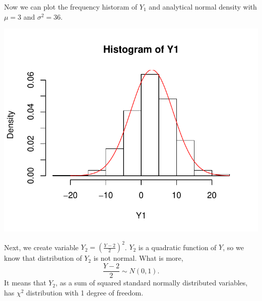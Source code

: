 \documentclass[12pt, a4paper]{article}\usepackage[]{graphicx}\usepackage[]{color}
\makeatletter
\def\maxwidth{ %
  \ifdim\Gin@nat@width>\linewidth
    \linewidth
  \else
    \Gin@nat@width
  \fi
}
\newenvironment{knitrout}{}{} %
\makeatother
\begin{document}
Now we can plot the frequency historam of $Y_1$ and analytical normal density with $\mu=3$ and $\sigma^2=36$.
\begin{knitrout}
\color{fgcolor}

{\centering \includegraphics[width=\maxwidth]{figure/ex1_1hist-1} 

}



\end{knitrout}

Next, we create variable $Y_2 = \left( \frac{Y-2}{2} \right)^2$.
$Y_2$ is a quadratic function of $Y$, so we know that distribution of $Y_2$ is not normal. What is more, 
\[\frac{Y-2}{2} \sim N(0,1).\] 
It means that $Y_2$, as a sum of squared standard normally distributed variables, has $\chi^2$ distribution with 1 degree of freedom.
\end{document}
